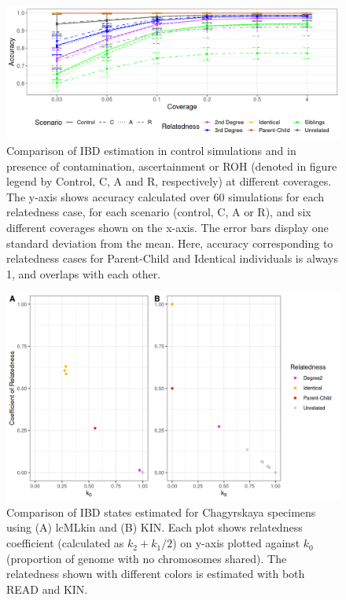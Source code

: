 \documentclass[12pt, letterpaper]{article}
\begin{document}
\begin{figure}[h!]
    \centering
    \includegraphics[width=18cm]{plots/plotimg/plot_IBDaccuracy_others_supp.png}
    \caption{Comparison of IBD estimation in control simulations and in presence of contamination, ascertainment or ROH (denoted in figure legend by Control, C, A and R, respectively) at different coverages. The y-axis shows accuracy calculated over 60 simulations for each relatedness case, for each scenario (control, C, A or R), and six different coverages shown on the x-axis. The error bars display one standard deviation from the mean. Here, accuracy corresponding to relatedness cases for Parent-Child and Identical individuals is always 1, and overlaps with each other.}
    \label{figS11:ibd_others}
\end{figure}


\begin{figure}[h!]
    \centering
    \includegraphics[width=18cm]{supplementary_info/plots/lcPlot.png}
    \caption{Comparison of IBD states estimated for Chagyrskaya specimens using (A) lcMLkin and (B) KIN. Each plot shows relatedness coefficient (calculated as $k_2+k_1/2$) on y-axis plotted against $k_0$ (proportion of genome with no chromosomes shared). The relatedness shown with different colors is estimated with both READ and KIN.}
    \label{figS6:Chagyrskaya_ibd}
\end{figure}
\end{document}
